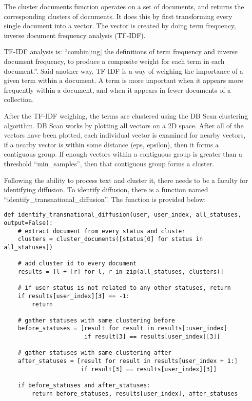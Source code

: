 The cluster documents function operates on a set of documents, and
returns the corresponding clusters of documents. It does this by first
transforming every single document into a vector. The vector is created
by doing term frequency, inverse document frequency analysis (TF-IDF).

TF-IDF analysis is: ``combin[ing] the definitions of term frequency
and inverse document frequency, to produce a composite weight for each
term in each document.''.\cite{informationretrieval} Said another way,
TF-IDF is a way of weighing the importance of a given term within a
document. A term is more important when it appears more frequently
within a document, and when it appears in fewer documents of a
collection.

After the TF-IDF weighing, the terms are clustered using the DB Scan
clustering algorithm. DB Scan works by plotting all vectors on a 2D
space. After all of the vectors have been plotted, each individual
vector is examined for nearby vectors, if a nearby vector is within
some distance (eps, epsilon), then it forms a contiguous group. If
enough vectors within a contiguous group is greater than a threshold
``min\_samples'', then that contiguous group forms a cluster.

Following the ability to process text and cluster it, there needs to
be a faculty for identifying diffusion. To identify diffusion, there
is a function named ``identify\_transnational\_diffusion''. The
function is provided below:

\begin{lstlisting}
def identify_transnational_diffusion(user, user_index, all_statuses, output=False):
    # extract document from every status and cluster
    clusters = cluster_documents([status[0] for status in all_statuses])
    
    # add cluster id to every document
    results = [l + [r] for l, r in zip(all_statuses, clusters)]
    
    # if user status is not related to any other statuses, return
    if results[user_index][3] == -1:
        return
    
    # gather statuses with same clustering before
    before_statuses = [result for result in results[:user_index]
                       if result[3] == results[user_index][3]]
    
    # gather statuses with same clustering after
    after_statuses = [result for result in results[user_index + 1:]
                      if result[3] == results[user_index][3]]
    
    if before_statuses and after_statuses:
        return before_statuses, results[user_index], after_statuses
\end{lstlisting}

